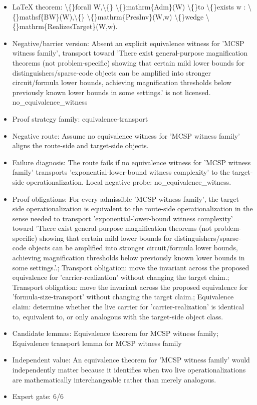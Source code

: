 \documentclass[11pt]{article}
\begin{document}
\begin{itemize}
\item LaTeX theorem: \textbackslash\{\}forall W,\textbackslash\{\} \textbackslash\{\}mathrm\{Adm\}(W) \textbackslash\{\}to \textbackslash\{\}exists w : \textbackslash\{\}mathsf\{BW\}(W),\textbackslash\{\} \textbackslash\{\}mathrm\{PresInv\}(W,w) \textbackslash\{\}wedge \textbackslash\{\}mathrm\{RealizesTarget\}(W,w).
\item Negative/barrier version: Absent an explicit equivalence witness for 'MCSP witness family', transport toward 'There exist general-purpose magnification theorems (not problem-specific) showing that certain mild lower bounds for distinguishers/sparse-code objects can be amplified into stronger circuit/formula lower bounds, achieving magnification thresholds below previously known lower bounds in some settings.' is not licensed. no\_equivalence\_witness
\item Proof strategy family: equivalence-transport
\item Negative route: Assume no equivalence witness for 'MCSP witness family' aligns the route-side and target-side objects.
\item Failure diagnosis: The route fails if no equivalence witness for 'MCSP witness family' transports 'exponential-lower-bound witness complexity' to the target-side operationalization. Local negative probe: no\_equivalence\_witness.
\item Proof obligations: For every admissible 'MCSP witness family', the target-side operationalization is equivalent to the route-side operationalization in the sense needed to transport 'exponential-lower-bound witness complexity' toward 'There exist general-purpose magnification theorems (not problem-specific) showing that certain mild lower bounds for distinguishers/sparse-code objects can be amplified into stronger circuit/formula lower bounds, achieving magnification thresholds below previously known lower bounds in some settings.'.; Transport obligation: move the invariant across the proposed equivalence for 'carrier-realization' without changing the target claim.; Transport obligation: move the invariant across the proposed equivalence for 'formula-size-transport' without changing the target claim.; Equivalence claim: determine whether the live carrier for 'carrier-realization' is identical to, equivalent to, or only analogous with the target-side object class.
\item Candidate lemmas: Equivalence theorem for MCSP witness family; Equivalence transport lemma for MCSP witness family
\item Independent value: An equivalence theorem for 'MCSP witness family' would independently matter because it identifies when two live operationalizations are mathematically interchangeable rather than merely analogous.
\item Expert gate: 6/6
\end{itemize}
\end{document}
